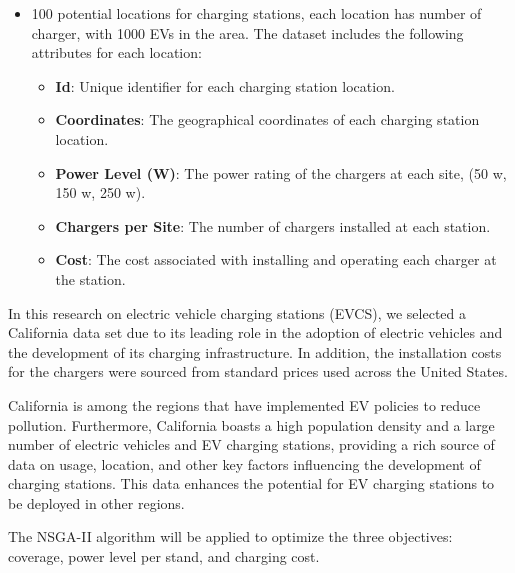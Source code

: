 \documentclass[12pt]{report}
\begin{document}
\begin{itemize}
    \item 100 potential locations for charging stations, each location has number of charger, with 1000 EVs in the area. The dataset includes the following attributes for each location:
    \begin{itemize}
        \item \textbf{Id}: Unique identifier for each charging station location.
        \item \textbf{Coordinates}: The geographical coordinates of each charging station location.
        \item \textbf{Power Level (W)}: The power rating of the chargers at each site, (50 w, 150 w, 250 w).
        \item \textbf{Chargers per Site}: The number of chargers installed at each station.
        \item \textbf{Cost}: The cost associated with installing and operating each charger at the station.
    \end{itemize}
\end{itemize}

In this research on electric vehicle charging stations (EVCS), we selected a California data set due to its leading role in the adoption of electric vehicles and the development of its charging infrastructure. In addition, the installation costs for the chargers were sourced from standard prices used across the United States.

California is among the regions that have implemented EV policies to reduce pollution. Furthermore, California boasts a high population density and a large number of electric vehicles and EV charging stations, providing a rich source of data on usage, location, and other key factors influencing the development of charging stations. This data enhances the potential for EV charging stations to be deployed in other regions.

The NSGA-II algorithm will be applied to optimize the three objectives: coverage, power level per stand, and charging cost.
\end{document}
